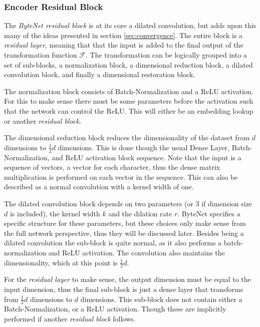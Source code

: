 \subsubsection{Encoder Residual Block}

The \textit{ByteNet residual block} is at its core a dilated convolution, but adds upon this many of the ideas presented in section \ref{sec:convergence}. The entire block is a \textit{residual layer}, meaning that that the input is added to the final output of the transformation function $\mathcal{F}$. The transformation can be logically grouped into a set of sub-blocks, a normalization block, a dimensional reduction block, a dilated convolution block, and finally a dimensional restoration block.

The normalization block consists of Batch-Normalization and a ReLU activation. For this to make sense there must be some parameters before the activation such that the network can control the ReLU. This will either be an embedding lookup or another \textit{residual block}.

The dimensional reduction block reduces the dimensionality of the dataset from $d$ dimensions to $\frac{1}{2}d$ dimensions. This is done though the usual Dense Layer, Batch-Normalization, and ReLU activation block sequence. Note that the input is a sequence of vectors, a vector for each character, thus the dense matrix multiplication is performed on each vector in the sequence. This can also be described as a normal convolution with a kernel width of one.

\afterpage{\clearpage}

The dilated convolution block depends on two parameters (or 3 if dimension size $d$ is included), the kernel width $k$ and the dilation rate $r$. ByteNet specifies a specific structure for these parameters, but these choices only make sense from the full network perspective, thus they will be discussed later. Besides being a dilated convolution the sub-block is quite normal, as it also performs a batch-normalization and ReLU activation. The convolution also maintains the dimensionality, which at this point is $\frac{1}{2}d$.

For the \textit{residual layer} to make sense, the output dimension must be equal to the input dimension, thus the final sub-block is just a dense layer that transforms from $\frac{1}{2}d$ dimensions to $d$ dimensions. This sub-block does not contain either a Batch-Normalization, or a ReLU activation. Though these are implicitly performed if another \textit{residual block} follows.

